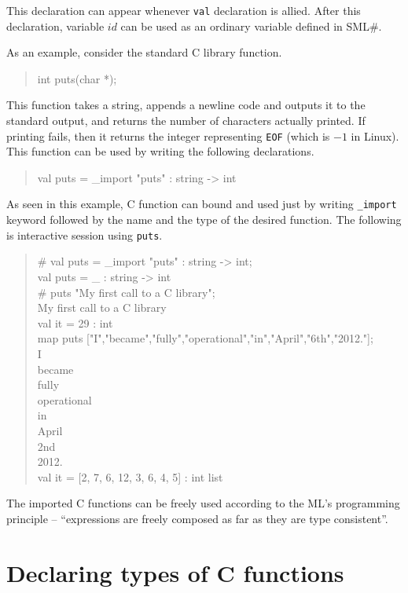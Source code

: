 \documentclass{jbook}
\newcommand{\txt}[2]{#2}
\newcommand{\smlsharp}{SML\#}
\newenvironment{program}{\begin{quote}\begin{tt}}%
                        {\end{tt}\end{quote}}
\begin{document}
	This declaration can appear whenever {\tt val} declaration is
allied.
	After this declaration, variable $\mathit{id}$ can be used as an ordinary
variable defined in \smlsharp{}.

	As an example, consider the standard C library function.
\begin{program}
int puts(char *);
\end{program}
	This function takes a string, appends a newline code and outputs
it to the standard output, and returns the number of characters actually
printed.
	If printing fails, then it returns the integer representing
{\tt EOF} (which is $-1$ in Linux).
	This function can be used by writing the following declarations.
\begin{program}
val puts = \_import "puts" : string -> int
\end{program}
	As seen in this example, C function can bound and used just by
writing {\tt \_import} keyword followed by the name and the type of the
desired function.
	The following is interactive session using {\tt puts}.
\begin{program}
\# val puts = \_import "puts" : string -> int;\\
val puts = \_ : string -> int\\
\# puts "My first call to a C library";\\
My first call to a C library\\
val it = 29 : int\\
map puts  ["I","became","fully","operational","in","April","6th","2012."];\\
I\\
became\\
fully\\
operational\\
in\\
April\\
2nd\\
2012.\\
val it = [2, 7, 6, 12, 3, 6, 4, 5] : int list
\end{program}
	The imported C functions can be freely used according to the
ML's programming principle -- ``expressions are freely
composed as far as they are type consistent''.
\fi%

\section{\txt{C関数の型}{Declaring types of C functions}}
\label{sec:extensionCtype}
\end{document}
